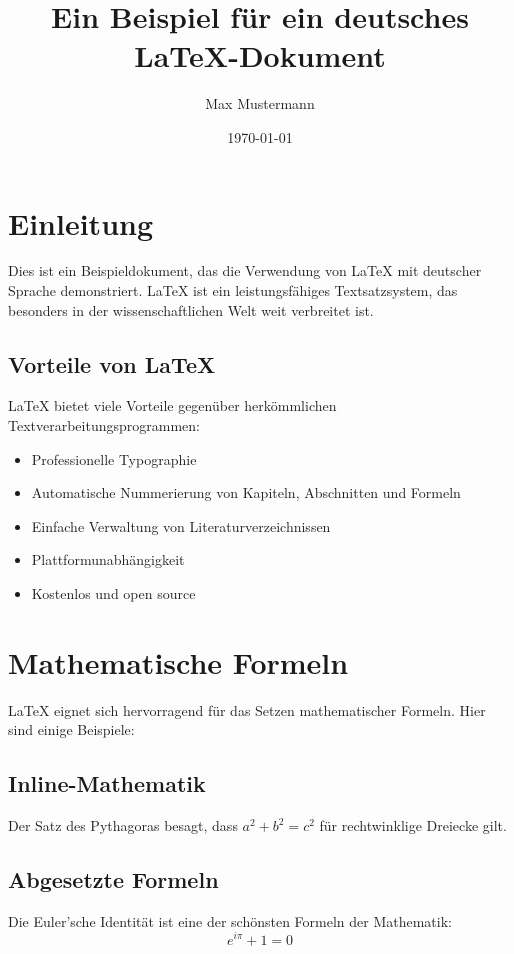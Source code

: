 \documentclass[12pt,a4paper]{article}
\title{Ein Beispiel für ein deutsches LaTeX-Dokument}
\author{Max Mustermann}
\date{\today}
\begin{document}
\maketitle

\tableofcontents
\newpage

\section{Einleitung}

Dies ist ein Beispieldokument, das die Verwendung von LaTeX mit deutscher Sprache demonstriert. LaTeX ist ein leistungsfähiges Textsatzsystem, das besonders in der wissenschaftlichen Welt weit verbreitet ist.

\subsection{Vorteile von LaTeX}

LaTeX bietet viele Vorteile gegenüber herkömmlichen Textverarbeitungsprogrammen:

\begin{itemize}
    \item Professionelle Typographie
    \item Automatische Nummerierung von Kapiteln, Abschnitten und Formeln
    \item Einfache Verwaltung von Literaturverzeichnissen
    \item Plattformunabhängigkeit
    \item Kostenlos und open source
\end{itemize}

\section{Mathematische Formeln}

LaTeX eignet sich hervorragend für das Setzen mathematischer Formeln. Hier sind einige Beispiele:

\subsection{Inline-Mathematik}
Der Satz des Pythagoras besagt, dass $a^2 + b^2 = c^2$ für rechtwinklige Dreiecke gilt.

\subsection{Abgesetzte Formeln}
Die Euler'sche Identität ist eine der schönsten Formeln der Mathematik:
\begin{equation}
    e^{i\pi} + 1 = 0
\end{equation}
\end{document}
